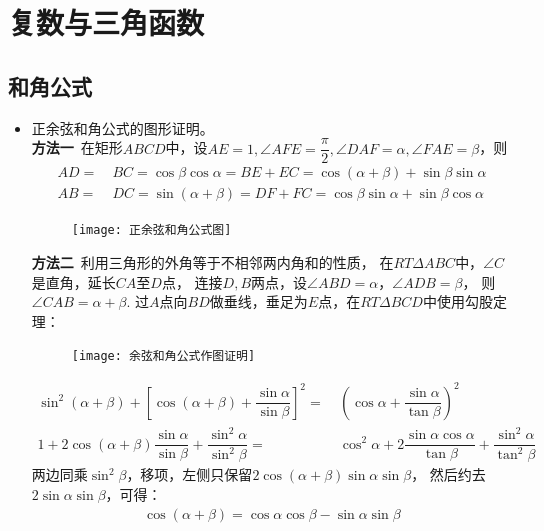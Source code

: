 \chapter{复数与三角函数}

\section{和角公式}

\begin{itemize}[leftmargin=\inteval{\myitemleftmargin}pt,itemsep=
   \inteval{\myitemitempsep}pt,topsep=\inteval{\myitemtopsep}pt]
\item 正余弦和角公式的图形证明。\\
\textbf{方法一}\ 在矩形$ ABCD $中，设$ AE=1,\angle AFE=\dfrac{\pi}{2},
\angle DAF=\alpha,\angle FAE=\beta $，则
\begin{align*}
AD=&\ BC=\cos\beta\cos\alpha=BE+EC=\cos(\alpha+\beta)+\sin\beta\sin\alpha  \\
AB=&\ DC=\sin(\alpha+\beta)=DF+FC=\cos\beta\sin\alpha+\sin\beta\cos\alpha  
\end{align*}
\begin{figure}[h]
\centering
\texttt{[image: 正余弦和角公式图]}
\end{figure}

\noindent \textbf{方法二}\ 利用三角形的外角等于不相邻两内角和的性质，
在$RT \Delta ABC $中，$ \angle C$是直角，延长$ CA $至$ D $点，
连接$ D,B $两点，设$ \angle ABD =\alpha $，$ \angle ADB =\beta $，
则$ \angle CAB =\alpha+\beta $. 
过$ A $点向$ BD $做垂线，垂足为$ E $点，在$ RT \Delta BCD $中使用勾股定理：
\begin{figure}[h]
\centering
\texttt{[image: 余弦和角公式作图证明]}
\end{figure}
\begin{align*}
\sin^2(\alpha +\beta )+\left[ \cos(\alpha +\beta )+\dfrac{\sin\alpha}{\sin\beta} \right] ^2 
=&\ \left( \cos\alpha +\dfrac{\sin\alpha}{\tan\beta }\right) ^2 \\
1+2\cos(\alpha +\beta )\dfrac{\sin\alpha}{\sin\beta}+\dfrac{\sin^2\alpha}{\sin^2\beta}=&\ 
\cos^2\alpha+2\dfrac{\sin\alpha \cos\alpha }{\tan\beta }+\dfrac{\sin^2\alpha}{\tan^2\beta }
\end{align*}
两边同乘$ \sin^2\beta $，移项，左侧只保留$ 2\cos(\alpha +\beta)\sin \alpha \sin\beta $，
然后约去$ 2\sin \alpha \sin\beta $，可得：
\begin{align*}
\cos(\alpha +\beta )=\cos \alpha \cos\beta - \sin \alpha \sin\beta 
\end{align*}


\end{itemize}
